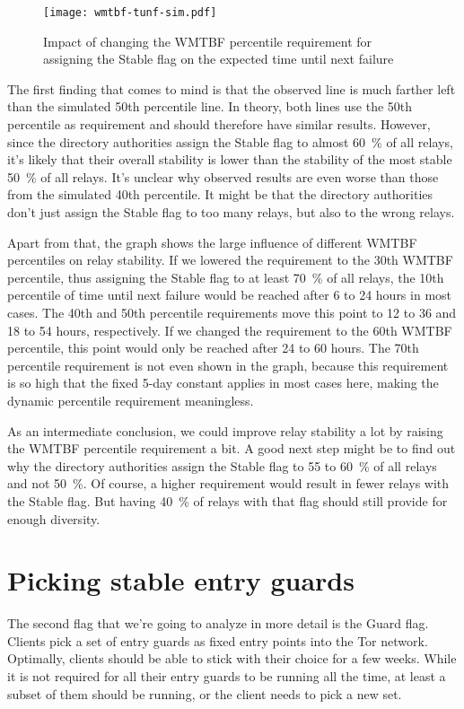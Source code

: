 \documentclass{article}
\begin{document}
\begin{figure}[t]
\texttt{[image: wmtbf-tunf-sim.pdf]}
\caption{Impact of changing the WMTBF percentile requirement for assigning
the Stable flag on the expected time until next failure}
\label{fig:wmtbf-tunf-sim}
\end{figure}

The first finding that comes to mind is that the observed line is much
farther left than the simulated 50th percentile line.
In theory, both lines use the 50th percentile as requirement and should
therefore have similar results.
However, since the directory authorities assign the Stable flag to almost
60~\% of all relays, it's likely that their overall stability is lower
than the stability of the most stable 50~\% of all relays.
It's unclear why observed results are even worse than those from the
simulated 40th percentile.
It might be that the directory authorities don't just assign the
Stable flag to too many relays, but also to the wrong relays.

Apart from that, the graph shows the large influence of different WMTBF
percentiles on relay stability.
If we lowered the requirement to the 30th WMTBF percentile, thus assigning
the Stable flag to at least 70~\% of all relays, the 10th percentile of
time until next failure would be reached after 6 to 24 hours in most
cases.
The 40th and 50th percentile requirements move this point to 12 to 36 and
18 to 54 hours, respectively.
If we changed the requirement to the 60th WMTBF percentile, this point
would only be reached after 24 to 60 hours.
The 70th percentile requirement is not even shown in the graph, because
this requirement is so high that the fixed 5-day constant applies in most
cases here, making the dynamic percentile requirement meaningless.

As an intermediate conclusion, we could improve relay stability a lot by
raising the WMTBF percentile requirement a bit.
A good next step might be to find out why the directory authorities assign
the Stable flag to 55 to 60~\% of all relays and not 50~\%.
Of course, a higher requirement would result in fewer relays with the
Stable flag.
But having 40~\% of relays with that flag should still provide for enough
diversity.

\section{Picking stable entry guards}

The second flag that we're going to analyze in more detail is the
Guard flag.
Clients pick a set of entry guards as fixed entry points into the Tor
network.
Optimally, clients should be able to stick with their choice for a few
weeks.
While it is not required for all their entry guards to be running all the
time, at least a subset of them should be running, or the client needs to
pick a new set.
\end{document}
